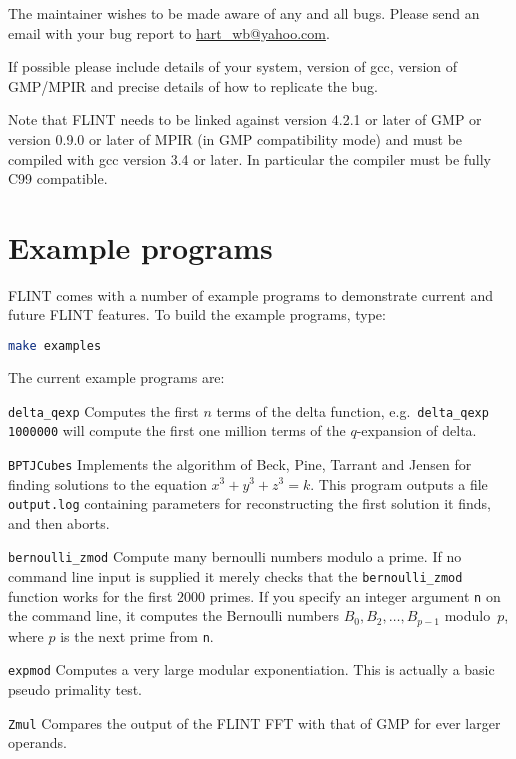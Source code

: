 \documentclass[a4paper,10pt]{book}
\newcommand{\code}{\lstinline}
\begin{document}
The maintainer wishes to be made aware of any and all bugs.  Please send an 
email with your bug report to \url{hart_wb@yahoo.com}.

If possible please include details of your system, version of gcc, version 
of GMP/MPIR and precise details of how to replicate the bug.

Note that FLINT needs to be linked against version 4.2.1 or later of GMP 
or version 0.9.0 or later of MPIR (in GMP compatibility mode) and must be 
compiled with gcc version 3.4 or later.  In particular the compiler must be 
fully C99 compatible.

\section{Example programs}

FLINT comes with a number of example programs to demonstrate current and 
future FLINT features.  To build the example programs, type:

\begin{lstlisting}[language=bash]
make examples
\end{lstlisting}

The current example programs are:

\code{delta_qexp}  Computes the first $n$ terms of the delta function, e.g.\ 
\code{delta_qexp 1000000} will compute the first one million terms of the 
$q$-expansion of delta.

\code{BPTJCubes}  Implements the algorithm of Beck, Pine, Tarrant and Jensen 
for finding solutions to the equation $x^3+y^3+z^3 = k$.  This program 
outputs a file \code{output.log} containing parameters for reconstructing the 
first solution it finds, and then aborts.

\code{bernoulli_zmod} Compute many bernoulli numbers modulo a prime.  If no 
command line input is supplied it merely checks that the \code{bernoulli_zmod} 
function works for the first $2000$ primes.  If you specify an integer 
argument \code{n} on the command line, it computes the Bernoulli numbers 
$B_0, B_2, \dotsc, B_{p-1}$ modulo~$p$, where $p$ is the next prime from 
\code{n}.

\code{expmod}  Computes a very large modular exponentiation.  This is actually 
a basic pseudo primality test.

\code{Zmul}  Compares the output of the FLINT FFT with that of GMP for ever 
larger operands.
\end{document}
